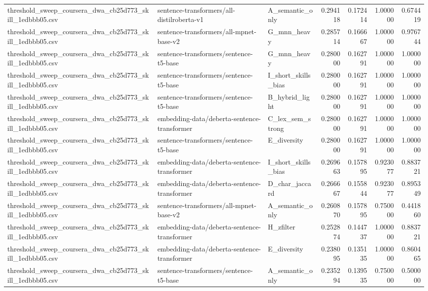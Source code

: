 \begin{table}[!ht]
\begin{tabular}{lllrrrr}
threshold\_sweep\_coursera\_dwa\_cb25d773\_skill\_1edbbb05.csv & sentence-transformers/all-distilroberta-v1 & A\_semantic\_only & 0.294118 & 0.172414 & 1.000000 & 0.674419 \\
threshold\_sweep\_coursera\_dwa\_cb25d773\_skill\_1edbbb05.csv & sentence-transformers/all-mpnet-base-v2 & G\_mnn\_heavy & 0.285714 & 0.166667 & 1.000000 & 0.976744 \\
threshold\_sweep\_coursera\_dwa\_cb25d773\_skill\_1edbbb05.csv & sentence-transformers/sentence-t5-base & G\_mnn\_heavy & 0.280000 & 0.162791 & 1.000000 & 1.000000 \\
threshold\_sweep\_coursera\_dwa\_cb25d773\_skill\_1edbbb05.csv & sentence-transformers/sentence-t5-base & I\_short\_skills\_bias & 0.280000 & 0.162791 & 1.000000 & 1.000000 \\
threshold\_sweep\_coursera\_dwa\_cb25d773\_skill\_1edbbb05.csv & sentence-transformers/sentence-t5-base & B\_hybrid\_light & 0.280000 & 0.162791 & 1.000000 & 1.000000 \\
threshold\_sweep\_coursera\_dwa\_cb25d773\_skill\_1edbbb05.csv & embedding-data/deberta-sentence-transformer & C\_lex\_sem\_strong & 0.280000 & 0.162791 & 1.000000 & 1.000000 \\
threshold\_sweep\_coursera\_dwa\_cb25d773\_skill\_1edbbb05.csv & sentence-transformers/sentence-t5-base & E\_diversity & 0.280000 & 0.162791 & 1.000000 & 1.000000 \\
threshold\_sweep\_coursera\_dwa\_cb25d773\_skill\_1edbbb05.csv & embedding-data/deberta-sentence-transformer & I\_short\_skills\_bias & 0.269663 & 0.157895 & 0.923077 & 0.883721 \\
threshold\_sweep\_coursera\_dwa\_cb25d773\_skill\_1edbbb05.csv & embedding-data/deberta-sentence-transformer & D\_char\_jaccard & 0.266667 & 0.155844 & 0.923077 & 0.895349 \\
threshold\_sweep\_coursera\_dwa\_cb25d773\_skill\_1edbbb05.csv & sentence-transformers/all-mpnet-base-v2 & A\_semantic\_only & 0.260870 & 0.157895 & 0.750000 & 0.441860 \\
threshold\_sweep\_coursera\_dwa\_cb25d773\_skill\_1edbbb05.csv & embedding-data/deberta-sentence-transformer & H\_zfilter & 0.252874 & 0.144737 & 1.000000 & 0.883721 \\
threshold\_sweep\_coursera\_dwa\_cb25d773\_skill\_1edbbb05.csv & embedding-data/deberta-sentence-transformer & E\_diversity & 0.238095 & 0.135135 & 1.000000 & 0.860465 \\
threshold\_sweep\_coursera\_dwa\_cb25d773\_skill\_1edbbb05.csv & sentence-transformers/sentence-t5-base & A\_semantic\_only & 0.235294 & 0.139535 & 0.750000 & 0.500000 \\

\end{tabular}
\end{table}

